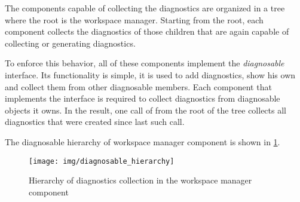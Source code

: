 The components capable of collecting the diagnostics are organized in a tree where the root is the workspace manager. Starting from the root, each component collects the diagnostics of those children that are again capable of collecting or generating diagnostics.

To enforce this behavior, all of these components implement the \emph{diagnosable} interface. Its functionality is simple, it is used to add diagnostics, show his own and collect them from other diagnosable members. Each component that implements the interface is required to collect diagnostics from diagnosable objects it owns. In the result, one call of  from the root of the tree collects all diagnostics that were created since last such call.

The diagnosable hierarchy of workspace manager component is shown in \cref{diagnosable_hierarchy}.

\begin{figure}
	\centering
	\texttt{[image: img/diagnosable\_hierarchy]}
	\caption{Hierarchy of diagnostics collection in the workspace manager component}
	\label{diagnosable_hierarchy}
\end{figure}